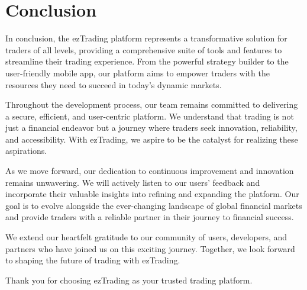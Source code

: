 \section{Conclusion}
\label{sec:conclusion}

In conclusion, the ezTrading platform represents a transformative solution for traders of all levels, providing a comprehensive suite of tools and features to streamline their trading experience. From the powerful strategy builder to the user-friendly mobile app, our platform aims to empower traders with the resources they need to succeed in today's dynamic markets.

Throughout the development process, our team remains committed to delivering a secure, efficient, and user-centric platform. We understand that trading is not just a financial endeavor but a journey where traders seek innovation, reliability, and accessibility. With ezTrading, we aspire to be the catalyst for realizing these aspirations.

As we move forward, our dedication to continuous improvement and innovation remains unwavering. We will actively listen to our users' feedback and incorporate their valuable insights into refining and expanding the platform. Our goal is to evolve alongside the ever-changing landscape of global financial markets and provide traders with a reliable partner in their journey to financial success.

We extend our heartfelt gratitude to our community of users, developers, and partners who have joined us on this exciting journey. Together, we look forward to shaping the future of trading with ezTrading.

Thank you for choosing ezTrading as your trusted trading platform.


